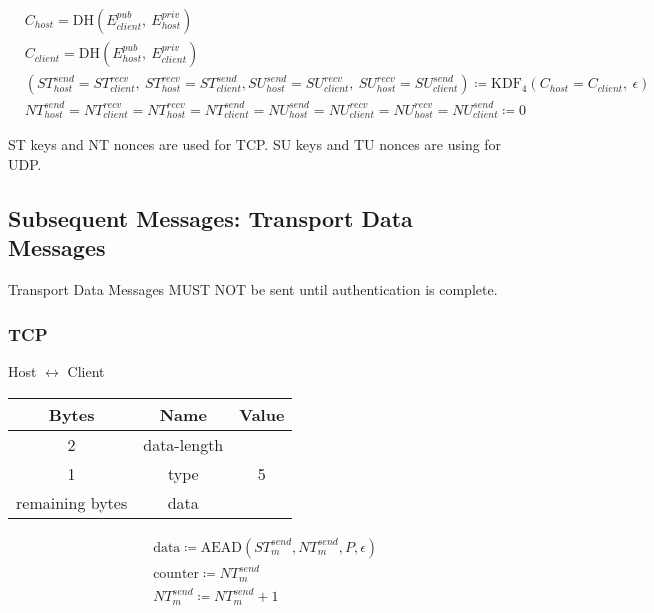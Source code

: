 \begin{align*}
    & C_{host} = \text{DH}(E_{client}^{pub},\ E_{host}^{priv})\\
    & C_{client} = \text{DH}(E_{host}^{pub},\ E_{client}^{priv})\\
    & (\mathit{ST}_{host}^{send} = \mathit{ST}_{client}^{recv},\ \mathit{ST}_{host}^{recv} = \mathit{ST}_{client}^{send}, \mathit{SU}_{host}^{send} = \mathit{SU}_{client}^{recv},\ \mathit{SU}_{host}^{recv} = \mathit{SU}_{client}^{send}) \coloneqq \text{KDF}_4(C_{host} = C_{client},
    \ \epsilon) \\
    & \mathit{NT}_{host}^{send} = \mathit{NT}_{client}^{recv} = \mathit{NT}_{host}^{recv} = \mathit{NT}_{client}^{send} = \mathit{NU}_{host}^{send} = \mathit{NU}_{client}^{recv} = \mathit{NU}_{host}^{recv} = \mathit{NU}_{client}^{send} \coloneqq 0
\end{align*}

ST keys and NT nonces are used for TCP. SU keys and TU nonces are using for UDP.

\subsection{Subsequent Messages: Transport Data Messages}

Transport Data Messages MUST NOT be sent until authentication is complete.

\subsubsection{TCP}

\begin{center}
    Host $\leftrightarrow$ Client\\
    \begin{tabular}{|c|c|c|}
        \hline
        \textbf{Bytes}  & \textbf{Name} & \textbf{Value} \\
        \hline
        2               & data-length   &                \\
        \hline
        1               & type          & 5              \\
        \hline
        remaining bytes & data          &                \\
        \hline
    \end{tabular}
\end{center}

\begin{align*}
    & \text{data} \coloneqq \text{AEAD}(\mathit{ST}_{m}^{send},\mathit{NT}_{m}^{send}, P, \epsilon)\\
    & \text{counter} \coloneqq \mathit{NT}_{m}^{send}\\
    & \mathit{NT}_{m}^{send} \coloneqq \mathit{NT}_{m}^{send} + 1
\end{align*}


